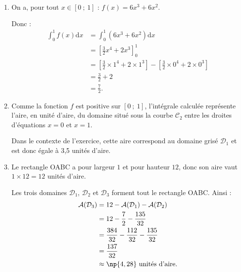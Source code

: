 \medskip

\begin{enumerate}
\item  On a, pour tout $x\in[0~;~1]$ : $f(x)=6x^3+6x^2$.

Donc :
\begin{align*}
\int_0^1 f(x)\mathrm{d}x &= \int_0^1\left(6x^3+6x^2\right)\mathrm{d}x \\
&= \left[\frac32x^4+2x^3\right]_0^1 \\
&= \left[\frac32\times1^4+2\times1^3\right] - \left[\frac32\times0^4+2\times0^3\right] \\
&=\frac32+2 \\
&= \frac72.
\end{align*}

\item Comme la fonction $f$ est positive sur $[0~;~1]$, l'intégrale calculée représente l'aire, en unité d'aire, du domaine situé sous la courbe $\mathcal{C}_2$ entre les droites d'équations $x=0$ et $x=1$.

Dans le contexte de l'exercice, cette aire correspond au domaine grisé $\mathcal{D}_1$ et est donc égale à 3,5 unités d'aire.

\item  Le rectangle OABC a pour largeur $1$ et pour hauteur $12$, donc son aire vaut $1\times 12=12$ unités d'aire.

Les trois domaines $\mathcal{D}_1$, $\mathcal{D}_2$ et $\mathcal{D}_3$ forment tout le rectangle OABC. Ainsi :
\begin{align*}
\mathcal{A}(\mathcal{D}_3) &= 12-\mathcal{A}(\mathcal{D}_1)-\mathcal{A}(\mathcal{D}_2) \\
&= 12-\dfrac72-\dfrac{135}{32} \\
&= \dfrac{384}{32}-\dfrac{112}{32}-\dfrac{135}{32} \\
&= \dfrac{137}{32} \\
&\approx \np{4,28} \text{ unités d'aire.}
\end{align*}
\end{enumerate}

\bigskip
